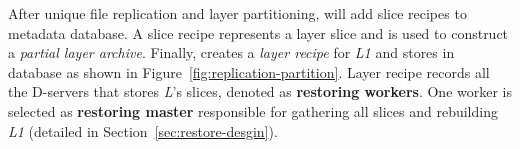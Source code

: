 After unique file replication and layer partitioning, 
\sysname will add slice recipes 
to metadata database.
A slice recipe represents a layer slice and
is used to construct a \emph{partial layer archive}.
%
%
%
Finally, 
\sysname creates a
\emph{layer recipe} for \emph{L1} and stores in database as shown in Figure~\ref{fig:replication-partition}.
Layer recipe records all the D-servers that stores \emph{L}'s slices, 
denoted as \textbf{restoring workers}.
One worker is selected as \textbf{restoring master} responsible 
for gathering all slices and rebuilding \emph{L1} (detailed in Section~\ref{sec:restore-desgin}).
%
%

